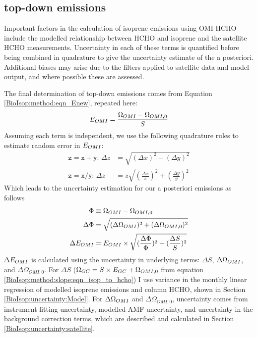   \subsection{top-down emissions}
    \label{BioIsop:uncertainty:eomi}
    
    Important factors in the calculation of isoprene emissions using OMI HCHO include the modelled relationship between HCHO and isoprene and the satellite HCHO measurements.
    Uncertainty in each of these terms is quantified before being combined in quadrature to give the uncertainty estimate of the a posteriori.
    Additional biases may arise due to the filters applied to satellite data and model output, and where possible these are assessed. 
    
    The final determination of top-down emissions comes from Equation \ref{BioIsop:method:eqn_Enew}, repeated here: 
    \begin{equation*}
      E_{OMI}=\frac{\Omega_{OMI} - \Omega_{OMI,0}}{S}
    \end{equation*}
    Assuming each term is independent, we use the following quadrature rules to estimate random error in $E_{OMI}$:
    \begin{align}
      \mathtt{z=x+y:} \, \Delta{z} & = \sqrt{(\Delta{x})^2 + (\Delta{y})^2} \label{BioIsop:uncertainty:eqn_quadrature_add} \\
      \mathtt{z=x/y:} \, \Delta{z} & = z \sqrt{(\frac{\Delta{x}}{x})^2 + (\frac{\Delta{y}}{y})^2} \label{BioIsop:uncertainty:eqn_quadrature_divide} 
    \end{align}
    Which leads to the uncertainty estimation for our a posteriori emissions as follows
    \begin{align}
      \Phi & \equiv \Omega_{OMI} - \Omega_{OMI,0}   \notag \\
      \Delta{\Phi} & = \sqrt{(\Delta{\Omega_{OMI}})^2 + (\Delta{\Omega_{OMI,0}})^2}  \label{BioIsop:uncertainty:eomi:eqn_delta_Phi} \\
      \Delta{E_{OMI}} &= E_{OMI} \times \sqrt{(\frac{\Delta{\Phi}}{\Phi})^2 + (\frac{\Delta{S}}{S})^2} \label{BioIsop:uncertainty:eomi:eqn_delta_apost}
    \end{align}
    $\Delta{E_{OMI}}$ is calculated using the uncertainty in underlying terms: $\Delta{S}$, $\Delta{\Omega_{OMI}}$, and $\Delta{\Omega_{OMI,0}}$. 
    For $\Delta{S}$ ($\Omega_{GC} = S \times E_{GC} + \Omega_{OMI,0}$ from equation \ref{BioIsop:method:slope:eqn_isop_to_hcho}) I use variance in the monthly linear regression of modelled isoprene emissions and column HCHO, shown in Section \ref{BioIsop:uncertainty:Model}.
    For $\Delta \Omega_{OMI}$ and $\Delta \Omega_{OMI,0}$, uncertainty comes from instrument fitting uncertainty, modelled AMF uncertainty, and uncertainty in the background correction terms, which are described and calculated in Section \ref{BioIsop:uncertainty:satellite}.
    
